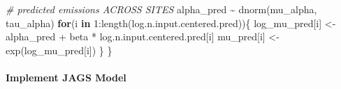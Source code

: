 \documentclass[
]{article}
\newenvironment{Shaded}{\begin{snugshade}}{\end{snugshade}}
\newcommand{\CommentTok}[1]{\textcolor[rgb]{0.56,0.35,0.01}{\textit{#1}}}
\newcommand{\ControlFlowTok}[1]{\textcolor[rgb]{0.13,0.29,0.53}{\textbf{#1}}}
\newcommand{\DecValTok}[1]{\textcolor[rgb]{0.00,0.00,0.81}{#1}}
\newcommand{\FunctionTok}[1]{\textcolor[rgb]{0.00,0.00,0.00}{#1}}
\newcommand{\NormalTok}[1]{#1}
\newcommand{\OtherTok}[1]{\textcolor[rgb]{0.56,0.35,0.01}{#1}}
\newcommand{\SpecialCharTok}[1]{\textcolor[rgb]{0.00,0.00,0.00}{#1}}
\begin{document}
\begin{Shaded}
\begin{Highlighting}[]
    \CommentTok{\# predicted emissions ACROSS SITES}
\NormalTok{      alpha\_pred }\SpecialCharTok{\textasciitilde{}} \FunctionTok{dnorm}\NormalTok{(mu\_alpha, tau\_alpha)}
      \ControlFlowTok{for}\NormalTok{(i }\ControlFlowTok{in} \DecValTok{1}\SpecialCharTok{:}\FunctionTok{length}\NormalTok{(log.n.input.centered.pred))\{}
\NormalTok{        log\_mu\_pred[i] }\OtherTok{\textless{}{-}}\NormalTok{ alpha\_pred }\SpecialCharTok{+}\NormalTok{ beta }\SpecialCharTok{*}\NormalTok{ log.n.input.centered.pred[i]}
\NormalTok{        mu\_pred[i] }\OtherTok{\textless{}{-}} \FunctionTok{exp}\NormalTok{(log\_mu\_pred[i])}
\NormalTok{      \}}
\NormalTok{\}}
\end{Highlighting}
\end{Shaded}

\hypertarget{implement-jags-model-2}{%
\paragraph{Implement JAGS Model}\label{implement-jags-model-2}}
\end{document}
